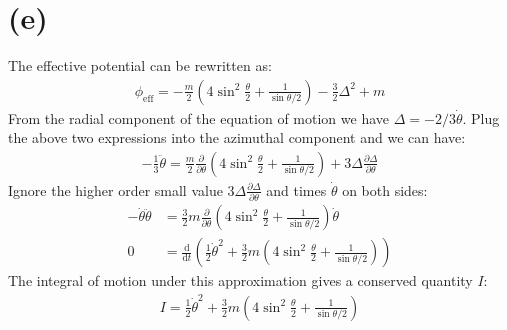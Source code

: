 \documentclass[a4paper,12pt]{article}
\renewcommand{\d}{\mathrm{d}}
\begin{document}
\section*{(e)}
The effective potential can be rewritten as:
\begin{align*}
    \phi_{\text{eff}} =-\frac{m}{2}(4\sin ^2 \frac{\theta}{2} +\frac{1}{\sin \theta/2}) - \frac{3}{2} \Delta^2 + m
\end{align*}
From the radial component of the equation of motion we have $\Delta = -2/3 \dot{\theta}$.
Plug the above two expressions into the azimuthal component and we can have:
\begin{align*}
    - \frac{1}{3} \ddot{\theta} = \frac{m}{2} \frac{\partial}{\partial \theta} (4\sin ^2 \frac{\theta}{2} +\frac{1}{\sin \theta/2}) + 3 \Delta \frac{\partial \Delta}{\partial \theta}
\end{align*}
Ignore the higher order small value $3 \Delta \frac{\partial \Delta}{\partial \theta}$ and times $\dot{\theta}$ on both sides:
\begin{align*}
    - \dot{\theta} \ddot{\theta} &= \frac{3}{2} m \frac{\partial}{\partial \theta} (4\sin ^2 \frac{\theta}{2} +\frac{1}{\sin \theta/2}) \dot{\theta} \\
    0 &= \frac{\d}{\d t}(\frac{1}{2} \dot{\theta}^2 + \frac{3}{2}m (4\sin ^2 \frac{\theta}{2} +\frac{1}{\sin \theta/2}))
\end{align*}
The integral of motion under this approximation gives a conserved quantity $I$:
\begin{align*}
    I = \frac{1}{2} \dot{\theta}^2 + \frac{3}{2}m (4\sin ^2 \frac{\theta}{2} +\frac{1}{\sin \theta/2})
\end{align*}
\end{document}
